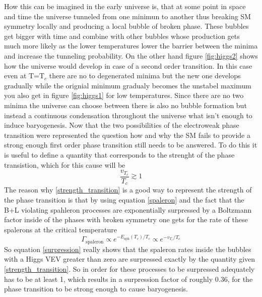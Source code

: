 How this can be imagined in the early universe is, that at some point in space and time the universe tunneled from one minimun to another thus breaking SM symmetry locally and producing a local bubble of broken phase. These bubbles get bigger with time and combine with other bubbles whose production gets much more likely as the lower temperatures lower the barrier between the minima and increase the tunneling probability. \newline
On the other hand figure \ref{fig:higgs2} shows how the universe would develop in case of a second order transition. In this case even at T=T$_c$ there are no to degenerated minima but the new one develops gradually while the orignial minimum gradualy becomes the unstabel maximum you also get in figure \ref{fig:higgs1} for low temperatures. Since there are no two minima the universe can choose between there is also no bubble formation but instead a continuous condensation throughout the universe what isn't enough to induce baryogenesis. \newline
Now that the two possibilities of the electroweak phase transition were represented the question how and why the SM fails to provide a strong enough first order phase transition still needs to be answered. \newline
To do this it is useful to define a quantity that corresponds to the strenght of the phase transistion, which for this cause will be 
\begin{equation}
	\frac{v_{T_c}}{T_c}\gtrsim1
	\label{strength_transition}
\end{equation}
The reason why \ref{strength_transition} is a good way to represent the strength of the phase transition is that by using equation \ref{spaleron} and the fact that the B+L violating spahleron processes are exponentially surpressed by a Boltzmann factor inside of the phases with broken symmetry one gets for the rate of these spalerons at the critical temperature
\begin{equation}
	\Gamma_\text{spaleron}\propto e^{-E_\text{sph}(T_c)/T_c}\propto e^{-v_{T_c}/T_c}
	\label{surpression}
\end{equation}
So equation \ref{surpression} really shows that the spaleron rates inside the bubbles with a Higgs VEV greater than zero are surpressed exactly by the quantity given \ref{strength_transition}. So in order for these processes to be surpressed adequately has to be at least 1, which results in a surpression factor of roughly 0.36, for the phase transition to be strong enough to cause baryogenesis. \newline 
